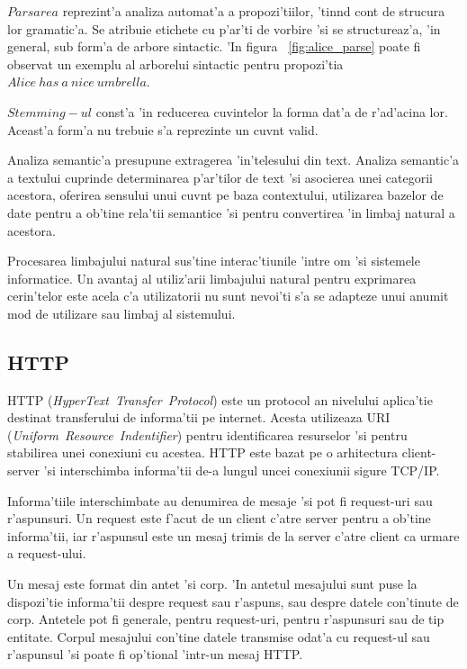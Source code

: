 \documentclass[12pt,a4paper,twoside]{report}
\begin{document}
$Parsarea$ reprezint'a analiza automat'a a propozi'tiilor, 'tin\ia nd cont de strucura lor gramatic'a. Se atribuie etichete cu p'ar'ti de vorbire 'si se structureaz'a, 'in general, sub form'a de arbore sintactic. 'In figura ~\ref{fig:alice_parse} poate fi observat un exemplu al arborelui sintactic pentru propozi'tia $Alice\ has\ a\ nice\ umbrella.$


$Stemming-ul$ const'a 'in reducerea cuvintelor la forma dat'a de r'ad'acina lor. Aceast'a form'a nu trebuie s'a reprezinte un cuv\ia nt valid.

Analiza semantic'a presupune extragerea 'in'telesului din text. Analiza semantic'a a textului cuprinde determinarea p'ar'tilor de text 'si asocierea unei categorii acestora, oferirea sensului unui cuv\ia nt pe baza contextului, utilizarea bazelor de date pentru a ob'tine rela'tii semantice 'si pentru convertirea 'in limbaj natural a acestora.


Procesarea limbajului natural sus'tine interac'tiunile 'intre om 'si sistemele informatice. Un avantaj al utiliz'arii limbajului natural pentru exprimarea cerin'telor este acela c'a utilizatorii nu sunt nevoi'ti s'a se adapteze unui anumit mod de utilizare sau limbaj al sistemului.

\subsection{HTTP}
HTTP ({\it HyperText\ Transfer\ Protocol}) este un protocol an nivelului aplica'tie destinat transferului de informa'tii pe internet.
Acesta utilizeaza URI ({\it Uniform\ Resource\ Indentifier}) pentru identificarea resurselor 'si pentru stabilirea unei conexiuni cu acestea. HTTP este bazat pe o arhitectura client-server 'si interschimba informa'tii de-a lungul uncei conexiunii sigure TCP/IP.

Informa'tiile interschimbate au denumirea de mesaje 'si pot fi request-uri sau r'aspunsuri. Un request este f'acut de un client c'atre server pentru a ob'tine informa'tii, iar r'aspunsul este un mesaj trimis de la server c'atre client ca urmare a request-ului. 

Un mesaj este format din antet 'si corp. 'In antetul mesajului sunt puse la dispozi'tie informa'tii despre request sau r'aspuns, sau despre datele con'tinute de corp. Antetele pot fi generale, pentru request-uri, pentru r'aspunsuri sau de tip entitate. Corpul mesajului con'tine datele transmise odat'a cu request-ul sau r'aspunsul 'si poate fi op'tional 'intr-un mesaj HTTP. 
\end{document}
